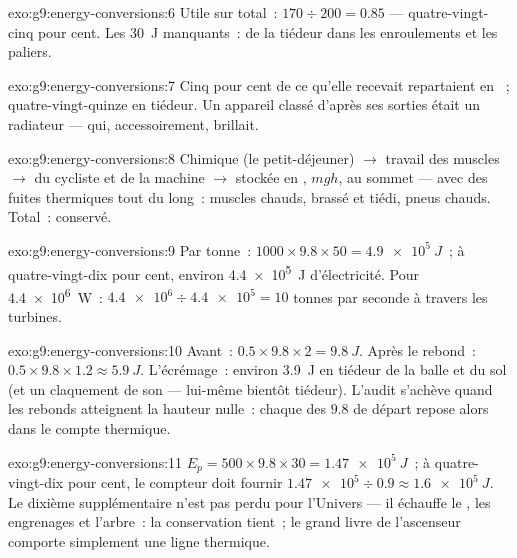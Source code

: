 \begin{solution}{exo:g9:energy-conversions:6}
Utile sur total~: $170 \div 200 = 0.85$ --- quatre-vingt-cinq pour
cent. Les \qty{30}{J} manquants~: de la tiédeur dans les
enroulements et les paliers.
\end{solution}

\begin{solution}{exo:g9:energy-conversions:7}
Cinq pour cent de ce qu'elle recevait repartaient en ~;
quatre-vingt-quinze en tiédeur. Un appareil classé d'après ses
sorties était un radiateur --- qui, accessoirement, brillait.
\end{solution}

\begin{solution}{exo:g9:energy-conversions:8}
Chimique (le petit-déjeuner) $\to$ travail des muscles $\to$  du cycliste et de la machine $\to$ stockée en , $m g h$, au sommet --- avec des fuites thermiques tout du
long~: muscles chauds,  brassé et tiédi, pneus chauds. Total~:
conservé.
\end{solution}

\begin{solution}{exo:g9:energy-conversions:9}
Par tonne~: $1000 \times 9.8 \times 50 = \qty{4.9e5}{J}$~; à
quatre-vingt-dix pour cent, environ \qty{4.4e5}{J} d'électricité.
Pour \qty{4.4e6}{W}~: $\num{4.4e6} \div \num{4.4e5} = 10$ tonnes par
seconde à travers les turbines.
\end{solution}

\begin{solution}{exo:g9:energy-conversions:10}
Avant~: $0.5 \times 9.8 \times 2 = \qty{9.8}{J}$. Après le rebond~:
$0.5 \times 9.8 \times 1.2 \approx \qty{5.9}{J}$. L'écrémage~:
environ \qty{3.9}{J} en tiédeur de la balle et du sol (et un claquement
de son --- lui-même bientôt tiédeur). L'audit s'achève quand les
rebonds atteignent la hauteur nulle~: chaque  des $9.8$ de départ
repose alors dans le compte thermique.
\end{solution}

\begin{solution}{exo:g9:energy-conversions:11}
$E_p = 500 \times 9.8 \times 30 = \qty{1.47e5}{J}$~; à
quatre-vingt-dix pour cent, le compteur doit fournir
$\num{1.47e5} \div 0.9 \approx \qty{1.6e5}{J}$. Le dixième
supplémentaire n'est pas perdu pour l'Univers --- il échauffe le
, les engrenages et l'arbre~: la conservation tient~; le grand
livre de l'ascenseur comporte simplement une ligne thermique.
\end{solution}

